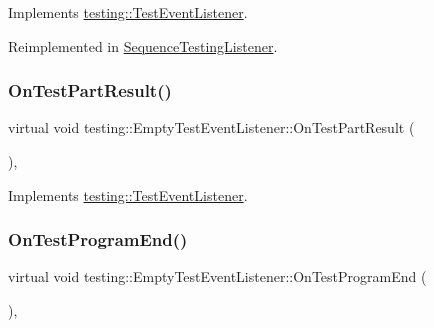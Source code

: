 Implements \hyperlink{classtesting_1_1_test_event_listener_a60cc09b7907cb329d152eb5e7133bdeb}{testing\+::\+Test\+Event\+Listener}.



Reimplemented in \hyperlink{class_sequence_testing_listener_a345641262fa10cc4b251ac54116db74b}{Sequence\+Testing\+Listener}.

\mbox{\label{classtesting_1_1_empty_test_event_listener_a59e7f7d9f2e2d089a6e8c1e2577f4718}} 
\subsubsection{\texorpdfstring{On\+Test\+Part\+Result()}{OnTestPartResult()}}
{\footnotesize\ttfamily virtual void testing\+::\+Empty\+Test\+Event\+Listener\+::\+On\+Test\+Part\+Result (\begin{DoxyParamCaption}\item[{const \hyperlink{classtesting_1_1_test_part_result}{Test\+Part\+Result} \&}]{ }\end{DoxyParamCaption})\hspace{0.3cm}{\ttfamily [inline]}, {\ttfamily [virtual]}}



Implements \hyperlink{classtesting_1_1_test_event_listener_a054f8705c883fa120b91473aff38f2ee}{testing\+::\+Test\+Event\+Listener}.

\mbox{\label{classtesting_1_1_empty_test_event_listener_a0abcc02bd2331a2e29ad6f4d9daf2a32}} 
\subsubsection{\texorpdfstring{On\+Test\+Program\+End()}{OnTestProgramEnd()}}
{\footnotesize\ttfamily virtual void testing\+::\+Empty\+Test\+Event\+Listener\+::\+On\+Test\+Program\+End (\begin{DoxyParamCaption}\item[{const \hyperlink{classtesting_1_1_unit_test}{Unit\+Test} \&}]{ }\end{DoxyParamCaption})\hspace{0.3cm}{\ttfamily [inline]}, {\ttfamily [virtual]}}




